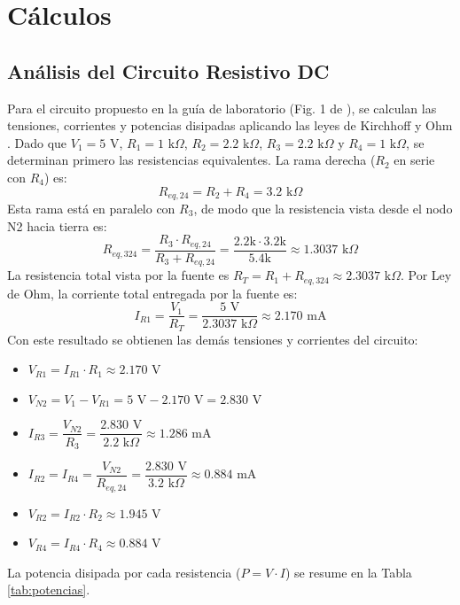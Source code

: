 \documentclass[journal, a4paper]{IEEEtran}
\begin{document}
\section{Cálculos}

\subsection{Análisis del Circuito Resistivo DC}
Para el circuito propuesto en la guía de laboratorio (Fig. 1 de \cite{guia_practica0}), se calculan las tensiones, corrientes y potencias disipadas aplicando las leyes de Kirchhoff y Ohm \cite{sedra2020}. Dado que $V_1 = 5\text{ V}$, $R_1=1\text{ k}\Omega$, $R_2=2.2\text{ k}\Omega$, $R_3=2.2\text{ k}\Omega$ y $R_4=1\text{ k}\Omega$, se determinan primero las resistencias equivalentes. La rama derecha ($R_2$ en serie con $R_4$) es:
\begin{equation}
    R_{eq,24} = R_2 + R_4 = 3.2\text{ k}\Omega
\end{equation}
Esta rama está en paralelo con $R_3$, de modo que la resistencia vista desde el nodo N2 hacia tierra es:
\begin{equation}
    R_{eq,324} = \frac{R_3 \cdot R_{eq,24}}{R_3 + R_{eq,24}} = \frac{2.2\text{k} \cdot 3.2\text{k}}{5.4\text{k}} \approx 1.3037\text{ k}\Omega
\end{equation}
La resistencia total vista por la fuente es $R_T = R_1 + R_{eq,324} \approx 2.3037\text{ k}\Omega$. Por Ley de Ohm, la corriente total entregada por la fuente es:
\begin{equation}
    I_{R1} = \frac{V_1}{R_T} = \frac{5\text{ V}}{2.3037\text{ k}\Omega} \approx 2.170\text{ mA}
\end{equation}
Con este resultado se obtienen las demás tensiones y corrientes del circuito:
\begin{itemize}
    \item $V_{R1} = I_{R1} \cdot R_1 \approx 2.170\text{ V}$
    \item $V_{N2} = V_1 - V_{R1} = 5\text{ V} - 2.170\text{ V} = 2.830\text{ V}$
    \item $I_{R3} = \dfrac{V_{N2}}{R_3} = \dfrac{2.830\text{ V}}{2.2\text{ k}\Omega} \approx 1.286\text{ mA}$
    \item $I_{R2} = I_{R4} = \dfrac{V_{N2}}{R_{eq,24}} = \dfrac{2.830\text{ V}}{3.2\text{ k}\Omega} \approx 0.884\text{ mA}$
    \item $V_{R2} = I_{R2} \cdot R_2 \approx 1.945\text{ V}$
    \item $V_{R4} = I_{R4} \cdot R_4 \approx 0.884\text{ V}$
\end{itemize}
La potencia disipada por cada resistencia ($P = V \cdot I$) se resume en la Tabla \ref{tab:potencias}.
\end{document}
